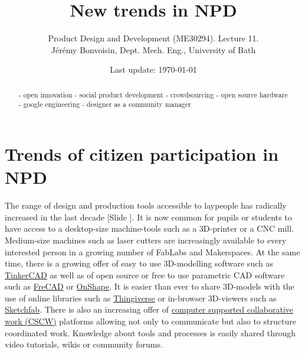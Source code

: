 \documentclass{article}
\newcounter{slide}
\begin{document}
\title{New trends in NPD}

\author{Product Design and Development (ME30294). Lecture 11. \\ Jérémy Bonvoisin, Dept. Mech. Eng., University of Bath}
\date{Last update: \today}

\maketitle

\begin{abstract}
- open innovation
- social product development
- crowdsourcing
- open source hardware
- google engineering
- designer as a community manager
\end{abstract}

\tableofcontents

\section{Trends of citizen participation in NPD}
\label{sec:context}
The range of design and production tools accessible to laypeople has radically increased in the last decade {\color{blue}[Slide ]}. It is now common for pupils or students to have access to a desktop-size machine-tools such as a 3D-printer or a CNC mill. Medium-size machines such as laser cutters are increasingly available to every interested person in a growing number of FabLabs and Makerspaces. At the same time, there is a growing offer of easy to use 3D-modelling software such as \href{https://www.tinkercad.com/}{TinkerCAD} as well as of open source or free to use parametric CAD software such as \href{https://www.freecadweb.org/}{FreCAD} or \href{https://www.onshape.com/}{OnShape}. It is easier than ever to share 3D-models with the use of online libraries such as \href{https://www.thingiverse.com/}{Thingiverse} or in-browser 3D-viewers such as \href{https://sketchfab.com/}{Sketchfab}. There is also an increasing offer of \href{https://en.wikipedia.org/wiki/Computer-supported_cooperative_work}{computer supported collaborative work (CSCW)} platforms allowing not only to communicate but also to structure coordinated work. Knowledge about tools and processes is easily shared through video tutorials, wikis or community forums.
\end{document}
